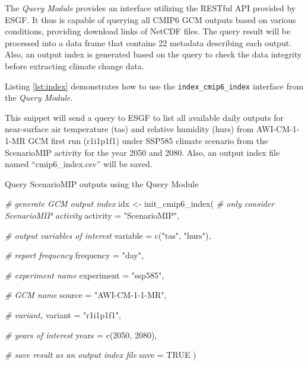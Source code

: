 \documentclass[twocolumn, a4paper,10pt]{article}
\newenvironment{Code}{\captionsetup{type=code}}{}
\newenvironment{Shaded}{\begin{mdframed}[skipabove=0pt]}{\end{mdframed}}
\newcommand{\AttributeTok}[1]{\textcolor[rgb]{0.77,0.63,0.00}{#1}}
\newcommand{\CommentTok}[1]{\textcolor[rgb]{0.56,0.35,0.01}{\textit{#1}}}
\newcommand{\ConstantTok}[1]{\textcolor[rgb]{0.00,0.00,0.00}{#1}}
\newcommand{\DecValTok}[1]{\textcolor[rgb]{0.00,0.00,0.81}{#1}}
\newcommand{\FunctionTok}[1]{\textcolor[rgb]{0.00,0.00,0.00}{#1}}
\newcommand{\NormalTok}[1]{#1}
\newcommand{\OtherTok}[1]{\textcolor[rgb]{0.56,0.35,0.01}{#1}}
\newcommand{\StringTok}[1]{\textcolor[rgb]{0.31,0.60,0.02}{#1}}
\begin{document}
The \emph{Query Module} provides an interface utilizing the RESTful API provided by
ESGF. It thus is capable of querying all CMIP6 GCM outputs based on various
conditions, providing download links of NetCDF files. The query result will be
processed into a data frame that contains 22 metadata describing each
output. Also, an output index is generated based on the query to
check the data integrity before extracting climate change data.

Listing \ref{lst:index} demonstrates how to use the \texttt{index\_cmip6\_index}
interface from the \emph{Query Module}.

This snippet will send a query to ESGF to list all available daily outputs for
near-surface air temperature (tas) and relative humidity (hurs) from
AWI-CM-1-1-MR GCM first run (r1i1p1f1) under SSP585 climate scenario from the
ScenarioMIP activity for the year 2050 and 2080. Also, an output index file
named ``cmip6\_index.csv'' will be saved.

\begin{Code}
\caption{Query ScenarioMIP outputs using the Query Module}

\label{lst:index}

\begin{Shaded}
\begin{Highlighting}[]
\CommentTok{\# generate GCM output index}
\NormalTok{idx }\OtherTok{\textless{}{-}} \FunctionTok{init\_cmip6\_index}\NormalTok{(}
  \CommentTok{\# only consider ScenarioMIP activity}
  \AttributeTok{activity =} \StringTok{"ScenarioMIP"}\NormalTok{,}

  \CommentTok{\# output variables of interest}
  \AttributeTok{variable =} \FunctionTok{c}\NormalTok{(}\StringTok{"tas"}\NormalTok{, }\StringTok{"hurs"}\NormalTok{),}

  \CommentTok{\# report frequency}
  \AttributeTok{frequency =} \StringTok{"day"}\NormalTok{,}

  \CommentTok{\# experiment name}
  \AttributeTok{experiment =} \StringTok{"ssp585"}\NormalTok{,}

  \CommentTok{\# GCM name}
  \AttributeTok{source =} \StringTok{"AWI{-}CM{-}1{-}1{-}MR"}\NormalTok{,}

  \CommentTok{\# variant,}
  \AttributeTok{variant =} \StringTok{"r1i1p1f1"}\NormalTok{,}

  \CommentTok{\# years of interest}
  \AttributeTok{years =} \FunctionTok{c}\NormalTok{(}\DecValTok{2050}\NormalTok{, }\DecValTok{2080}\NormalTok{),}

  \CommentTok{\# save result as an output index file}
  \AttributeTok{save =} \ConstantTok{TRUE}
\NormalTok{)}
\end{Highlighting}
\end{Shaded}

\end{Code}
\end{document}
